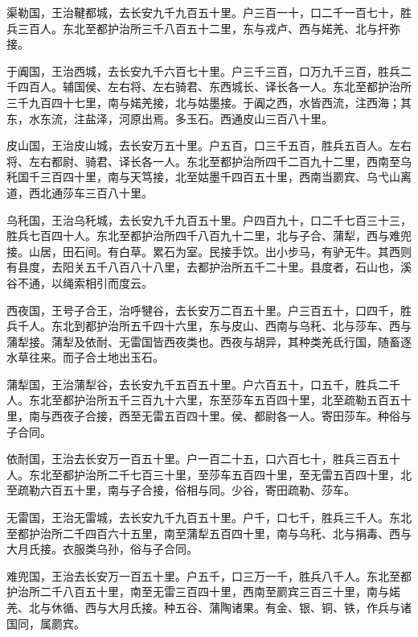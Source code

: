 \documentclass[12pt,UTF8]{ctexbook}
\begin{document}
渠勒国，王治鞬都城，去长安九千九百五十里。户三百一十，口二千一百七十，胜兵三百人。东北至都护治所三千八百五十二里，东与戎卢、西与婼羌、北与扞弥接。



于阗国，王治西城，去长安九千六百七十里。户三千三百，口万九千三百，胜兵二千四百人。辅国侯、左右将、左右骑君、东西城长、译长各一人。东北至都护治所三千九百四十七里，南与婼羌接，北与姑墨接。于阗之西，水皆西流，注西海；其东，水东流，注盐泽，河原出焉。多玉石。西通皮山三百八十里。



皮山国，王治皮山城，去长安万五十里。户五百，口三千五百，胜兵五百人。左右将、左右都尉、骑君、译长各一人。东北至都护治所四千二百九十二里，西南至乌秅国千三百四十里，南与天笃接，北至姑墨千四百五十里，西南当罽宾、乌弋山离道，西北通莎车三百八十里。



乌秅国，王治乌秅城，去长安九千九百五十里。户四百九十，口二千七百三十三，胜兵七百四十人。东北至都护治所四千八百九十二里，北与子合、蒲犁，西与难兜接。山居，田石间。有白草。累石为室。民接手饮。出小步马，有驴无牛。其西则有县度，去阳关五千八百八十八里，去都护治所五千二十里。县度者，石山也，溪谷不通，以绳索相引而度云。



西夜国，王号子合王，治呼犍谷，去长安万二百五十里。户三百五十，口四千，胜兵千人。东北到都护治所五千四十六里，东与皮山、西南与乌秅、北与莎车、西与蒲犁接。蒲犁及依耐、无雷国皆西夜类也。西夜与胡异，其种类羌氐行国，随畜逐水草往来。而子合土地出玉石。



蒲犁国，王治蒲犁谷，去长安九千五百五十里。户六百五十，口五千，胜兵二千人。东北至都护治所五千三百九十六里，东至莎车五百四十里，北至疏勒五百五十里，南与西夜子合接，西至无雷五百四十里。侯、都尉各一人。寄田莎车。种俗与子合同。



依耐国，王治去长安万一百五十里。户一百二十五，口六百七十，胜兵三百五十人。东北至都护治所二千七百三十里，至莎车五百四十里，至无雷五百四十里，北至疏勒六百五十里，南与子合接，俗相与同。少谷，寄田疏勒、莎车。



无雷国，王治无雷城，去长安九千九百五十里。户千，口七千，胜兵三千人。东北至都护治所二千四百六十五里，南至蒲犁五百四十里，南与乌秅、北与捐毒、西与大月氏接。衣服类乌孙，俗与子合同。



难兜国，王治去长安万一百五十里。户五千，口三万一千，胜兵八千人。东北至都护治所二千八百五十里，南至无雷三百四十里，西南至罽宾三百三十里，南与婼羌、北与休循、西与大月氏接。种五谷、蒲陶诸果。有金、银、铜、铁，作兵与诸国同，属罽宾。
\end{document}
